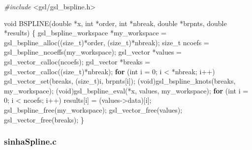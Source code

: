 \documentclass[
  12pt,
]{article}
\newenvironment{Shaded}{\begin{snugshade}}{\end{snugshade}}
\newcommand{\ControlFlowTok}[1]{\textcolor[rgb]{0.13,0.29,0.53}{\textbf{#1}}}
\newcommand{\DataTypeTok}[1]{\textcolor[rgb]{0.13,0.29,0.53}{#1}}
\newcommand{\DecValTok}[1]{\textcolor[rgb]{0.00,0.00,0.81}{#1}}
\newcommand{\ImportTok}[1]{#1}
\newcommand{\NormalTok}[1]{#1}
\newcommand{\PreprocessorTok}[1]{\textcolor[rgb]{0.56,0.35,0.01}{\textit{#1}}}
\begin{document}
\begin{Shaded}
\begin{Highlighting}[]
\PreprocessorTok{\#include }\ImportTok{\textless{}gsl/gsl\_bspline.h\textgreater{}}

\DataTypeTok{void}\NormalTok{ BSPLINE(}\DataTypeTok{double}\NormalTok{ *x, }\DataTypeTok{int}\NormalTok{ *order, }\DataTypeTok{int}\NormalTok{ *nbreak, }\DataTypeTok{double}\NormalTok{ *brpnts,}
             \DataTypeTok{double}\NormalTok{ *results) \{}
\NormalTok{    gsl\_bspline\_workspace *my\_workspace =}
\NormalTok{        gsl\_bspline\_alloc((}\DataTypeTok{size\_t}\NormalTok{)*order, (}\DataTypeTok{size\_t}\NormalTok{)*nbreak);}
    \DataTypeTok{size\_t}\NormalTok{ ncoefs = gsl\_bspline\_ncoeffs(my\_workspace);}
\NormalTok{    gsl\_vector *values = gsl\_vector\_calloc(ncoefs);}
\NormalTok{    gsl\_vector *breaks = gsl\_vector\_calloc((}\DataTypeTok{size\_t}\NormalTok{)*nbreak);}
    \ControlFlowTok{for}\NormalTok{ (}\DataTypeTok{int}\NormalTok{ i = }\DecValTok{0}\NormalTok{; i \textless{} *nbreak; i++)}
\NormalTok{        gsl\_vector\_set(breaks, (}\DataTypeTok{size\_t}\NormalTok{)i, brpnts[i]);}
\NormalTok{    (}\DataTypeTok{void}\NormalTok{)gsl\_bspline\_knots(breaks, my\_workspace);}
\NormalTok{    (}\DataTypeTok{void}\NormalTok{)gsl\_bspline\_eval(*x, values, my\_workspace);}
    \ControlFlowTok{for}\NormalTok{ (}\DataTypeTok{int}\NormalTok{ i = }\DecValTok{0}\NormalTok{; i \textless{} ncoefs; i++) results[i] = (values{-}\textgreater{}data)[i];}
\NormalTok{    gsl\_bspline\_free(my\_workspace);}
\NormalTok{    gsl\_vector\_free(values);}
\NormalTok{    gsl\_vector\_free(breaks);}
\NormalTok{\}}
\end{Highlighting}
\end{Shaded}

\hypertarget{sinhaspline.c}{%
\subsubsection{sinhaSpline.c}\label{sinhaspline.c}}
\end{document}
